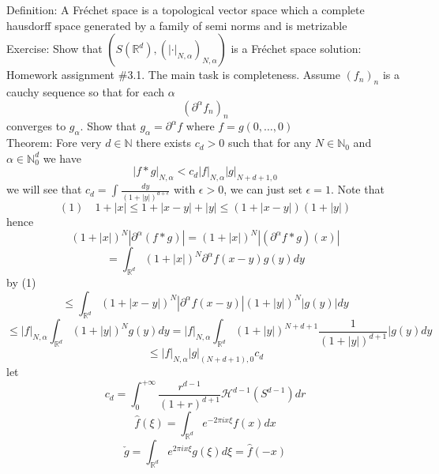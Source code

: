 \documentclass[11pt]{article}
\begin{document}
Definition: A Fréchet space is a topological vector space which a complete hausdorff space
generated by a family  of semi norms and is metrizable
\\
Exercise: Show that $(S( \mathbb{R}^{d}), (|\cdot |_{N,\alpha})_{N,\alpha})$ is a Fréchet space
solution: Homework assignment \#3.1.
The main task is completeness. Assume $(f_n)_n$ is a cauchy sequence so that for each
$\alpha$
\[
 (\partial^{\alpha}f_n)_n 
\] 
converges to $g_\alpha$.
Show that $g_\alpha = \partial^{\alpha}f$ where $f = g(0,\dots,0)$\\
Theorem:  Fore very $d \in \mathbb{N}$ there exists $c_d > 0$ such that
for any  $N \in \mathbb{N}_0$ and $\alpha \in \mathbb{N}_0^{d}$ we have
\[
    |f * g|_{N,\alpha} < c_d |f|_{N,\alpha} |g|_{N+d+1,0}
\] 
we will see that $c_d = \int_{}^{}\frac{dy}{(1+|y|)^{d+\epsilon}}$ with $\epsilon > 0$, we can just set $\epsilon = 1$.
Note that
\[
    (1) \quad 1 + |x| \le 1 + |x-y| + |y| \le (1 + |x-y|)(1+|y|)
\] 
hence
\[
    (1+|x|)^{N} |\partial^{\alpha}(f * g)| = (1 + |x|)^{N}|(\partial^{\alpha}f * g)(x)|
\] 
\[
= \int_{ \mathbb{R}^{d}}^{}(1 + |x|)^{N} \partial^{\alpha}f(x-y)g(y)dy
\] 
by (1)
\[
\le \int_{ \mathbb{R}^{d}}^{} (1 + |x-y|)^{N}|\partial^{\alpha}f(x-y)|(1+|y|)^{N}|g(y)| dy
\] 
\[
    \le |f|_{N,\alpha} \int_{ \mathbb{R}^{d}}^{}(1+|y|)^{N}g(y)dy = |f|_{N,\alpha} \int_{ \mathbb{R}^{d}}^{}(1+|y|)^{N+d+1} \frac{1}{(1 + |y|)^{d+1}} |g(y)dy
\] 
\[
    \le |f|_{N,\alpha} |g|_{(N+d+1),0} c_d
\] 
let
\[
    c_d = \int_{ 0}^{+\infty} \frac{r^{d-1}}{(1+r)^{d+1}} \mathcal{H}^{d-1} ( S^{d-1})dr
\] 
\[
\hat f(\xi) = \int_{ \mathbb{R}^{d}}^{}e^{-2\pi i x \xi}f(x)dx
\] 
\[
\check g = \int_{ \mathbb{R}^{d}}^{}e^{2\pi i x \xi} g(\xi) d\xi = \hat f(-x)
\] 
\end{document}
